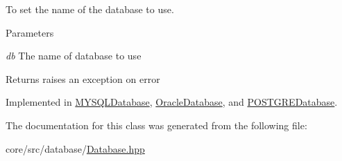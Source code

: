 To set the name of the database to use. 


\begin{DoxyParams}{Parameters}
\item[{\em db}]The name of database to use \end{DoxyParams}
\begin{DoxyReturn}{Returns}
raises an exception on error 
\end{DoxyReturn}


Implemented in \hyperlink{classMYSQLDatabase_a884c0742ea2d4d44d8c177144f5279ef}{MYSQLDatabase}, \hyperlink{classOracleDatabase_a937a096b286c4e6738ea5d314aabe109}{OracleDatabase}, and \hyperlink{classPOSTGREDatabase_acadff2a3649a40b323eb7711e0d705cf}{POSTGREDatabase}.



The documentation for this class was generated from the following file:\begin{DoxyCompactItemize}
\item 
core/src/database/\hyperlink{Database_8hpp}{Database.hpp}\end{DoxyCompactItemize}
